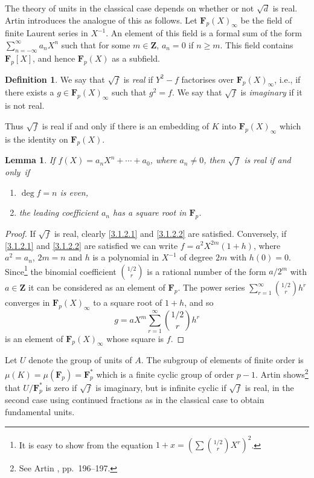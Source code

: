 \documentclass[10pt,leqno]{article}
\newtheorem{lemm}[theo]{Lemma}
\theoremstyle{definition}
\newtheorem{defi}[theo]{Definition}
\def\ZZ{\mathbf{Z}}
\def\FF{\mathbf{F}}
\def\fntwtw{It is easy to show from the equation $1 + x = (\sum \binom{1/2}{r} X^r)^2$.}
\def\fntwth{See Artin \cite{bib:6}, pp.~196--197.}
\begin{document}
The theory of units in the classical case depends on whether or not $\sqrt d$ is real.
Artin introduces the analogue of this as follows.
Let $\FF_p(X)_\infty$ be the field of finite Laurent series in $X^{-1}$.
An element of this field is a formal sum of the form $\sum_{n=-\infty}^{\infty} a_n X^n$ such that for some $m \in \ZZ$, $a_n = 0$ if $n \geq m$.
This field contains $\FF_p[X]$, and hence $\FF_p(X)$ as a subfield.


\begin{defi}
\label{3.1.1}
We say that $\sqrt f$ is \emph{real} if $Y^2 - f$ factorises over $\FF_p(X)_\infty$, i.e., if there exists a $g \in \FF_p(X)_\infty$ such that $g^2 = f$.
We say that $\sqrt f$ is \emph{imaginary} if it is not real.
\end{defi}

Thus $\sqrt f$ is real if and only if there is an embedding of $K$ into $\FF_p(X)_\infty$ which is the identity on $\FF_p(X)$.

\begin{lemm}
\label{3.1.2}
If $f(X) = a_n X^n + \cdots + a_0$, where $a_n \not= 0$, then $\sqrt f$ is real if and only~if%
\begin{enumerate}
\item
\label{3.1.2.1}
$\deg f = n$ is even,

\item
\label{3.1.2.2}
the leading coefficient $a_n$ has a square root in $\FF_p$.
\end{enumerate}
\end{lemm}

\begin{proof}
If $\sqrt f$ is real, clearly \eqref{3.1.2.1} and \eqref{3.1.2.2} are satisfied.
Conversely, if \eqref{3.1.2.1} and \eqref{3.1.2.2} are satisfied we can write $f = a^2 X^{2m}(1 + h)$, where $a^2 = a_n$, $2m = n$ and $h$ is a polynomial in $X^{-1}$ of degree $2m$ with $h(0) = 0$.
Since\footnote{\fntwtw} the binomial coefficient $\binom{1/2}{r}$ is a rational number of the form $a/2^m$ with $a\in\ZZ$ it can be considered as an element of $\FF_p$.
The power series $\sum_{r=1}^\infty \binom{1/2}{r} h^r$ converges in $\FF_p(X)_\infty$ to a square root of $1+h$, and so
\[
g = aX^m \sum_{r=1}^\infty \binom{1/2}{r} h^r
\]
is an element of $\FF_p(X)_\infty$ whose square is $f$.
\end{proof}

Let $U$ denote the group of units of $A$.
The subgroup of elements of finite order is $\mu(K) = \mu(\FF_p) = \FF_p^*$ which is a finite cyclic group of order $p-1$.
Artin shows\footnote{\fntwth} that $U / \FF_p^*$ is zero if $\sqrt f$ is imaginary, but is infinite cyclic if $\sqrt f$ is real, in the second case using continued fractions as in the classical case to obtain fundamental units.
\end{document}

